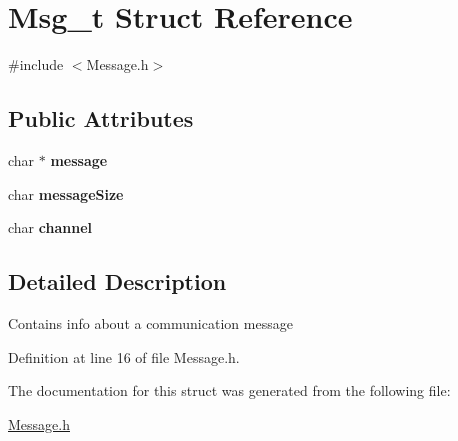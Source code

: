 \hypertarget{structMsg__t}{
\section{Msg\_\-t Struct Reference}
\label{structMsg__t}
}


{\ttfamily \#include $<$Message.h$>$}

\subsection*{Public Attributes}
\begin{DoxyCompactItemize}
\item 
\hypertarget{structMsg__t_a6bb847a9d1fd95ff580af8c90c3f29da}{
char $\ast$ {\bfseries message}}
\label{structMsg__t_a6bb847a9d1fd95ff580af8c90c3f29da}

\item 
\hypertarget{structMsg__t_a19d34d0b167dce682188cb8a99632590}{
char {\bfseries messageSize}}
\label{structMsg__t_a19d34d0b167dce682188cb8a99632590}

\item 
\hypertarget{structMsg__t_ab0457e50e0f08b605be2c5a5eafa09db}{
char {\bfseries channel}}
\label{structMsg__t_ab0457e50e0f08b605be2c5a5eafa09db}

\end{DoxyCompactItemize}


\subsection{Detailed Description}
Contains info about a communication message 

Definition at line 16 of file Message.h.



The documentation for this struct was generated from the following file:\begin{DoxyCompactItemize}
\item 
\hyperlink{Message_8h}{Message.h}\end{DoxyCompactItemize}
